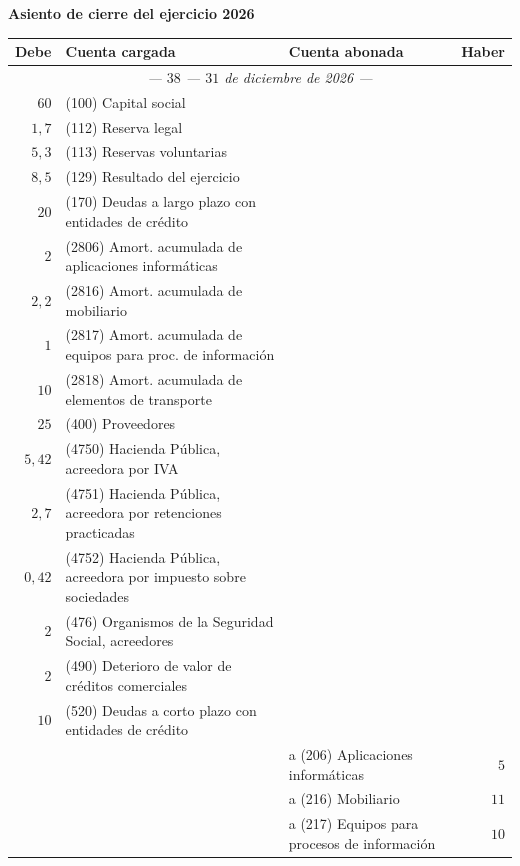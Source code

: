\documentclass[10pt,a4paper]{article}
\begin{document}
\begin{center}\begin{minipage}{\linewidth}\centering
{\small\textbf{Asiento de cierre del ejercicio 2026}}\par\vspace{0.3em}
{\small
\begin{tabular}{r p{5.6cm} p{6.4cm} r}
\hline
\textbf{Debe} & \textbf{Cuenta cargada} & \textbf{Cuenta abonada} & \textbf{Haber} \\
\hline
\multicolumn{4}{c}{\textit{--- $38$ --- $31$ de diciembre de 2026 ---}} \\
$60$ & (100) Capital social & & \\
$1,7$ & (112) Reserva legal & & \\
$5,3$ & (113) Reservas voluntarias & & \\
$8,5$ & (129) Resultado del ejercicio & & \\
$20$ & \raggedright (170) Deudas a largo plazo con entidades de crédito & & \\
$2$ & \raggedright (2806) Amort. acumulada de aplicaciones informáticas & & \\
$2,2$ & \raggedright (2816) Amort. acumulada de mobiliario & & \\
$1$ & \raggedright (2817) Amort. acumulada de equipos para proc. de información & & \\
$10$ & \raggedright (2818) Amort. acumulada de elementos de transporte & & \\
$25$ & (400) Proveedores & & \\
$5,42$ & \raggedright (4750) Hacienda Pública, acreedora por IVA & & \\
$2,7$ & \raggedright (4751) Hacienda Pública, acreedora por retenciones practicadas & & \\
$0,42$ & \raggedright (4752) Hacienda Pública, acreedora por impuesto sobre sociedades & & \\
$2$ & \raggedright (476) Organismos de la Seguridad Social, acreedores & & \\
$2$ & \raggedright (490) Deterioro de valor de créditos comerciales & & \\
$10$ & \raggedright (520) Deudas a corto plazo con entidades de crédito & & \\
 & & \raggedright a (206) Aplicaciones informáticas & $5$ \\
 & & \raggedright a (216) Mobiliario & $11$ \\
 & & \raggedright a (217) Equipos para procesos de información & $10$ \\

\end{tabular}}
\end{minipage}
\end{center}
\end{document}

